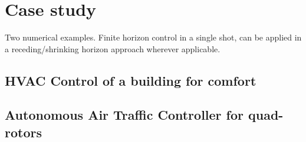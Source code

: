 \section{Case study}
\label{sec:case study}
Two numerical examples. Finite horizon control in a single shot, can be applied in a receding/shrinking horizon approach wherever applicable. 


\subsection{HVAC Control of a building for comfort}



\subsection{Autonomous Air Traffic Controller for quad-rotors}


